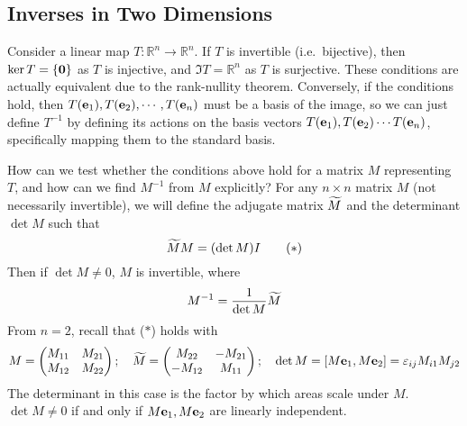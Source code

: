 \subsection{Inverses in Two Dimensions}
Consider a linear map \(T\colon \mathbb R^n \to \mathbb R^n\).
If \(T\) is invertible (i.e.\ bijective), then \(\ker T = \{ \vb 0 \}\) as \(T\) is injective, and \(\Im T = \mathbb R^n\) as \(T\) is surjective.
These conditions are actually equivalent due to the rank-nullity theorem.
Conversely, if the conditions hold, then \(T(\vb e_1), T(\vb e_2), \cdots, T(\vb e_n)\) must be a basis of the image, so we can just define \(T^{-1}\) by defining its actions on the basis vectors \(T(\vb e_1), T(\vb e_2) \cdots T(\vb e_n)\), specifically mapping them to the standard basis.

How can we test whether the conditions above hold for a matrix \(M\) representing \(T\), and how can we find \(M^{-1}\) from \(M\) explicitly? For any \(n \times n\) matrix \(M\) (not necessarily invertible), we will define the adjugate matrix \(\widetilde{M}\) and the determinant \(\det M\) such that
\[
	\widetilde{M} M = (\det M) I \tag{\(\ast\)}
\]
Then if \(\det M \neq 0\), \(M\) is invertible, where
\[
	M^{-1} = \frac{1}{\det M}\widetilde{M}
\]
From \(n=2\), recall that (\(\ast\)) holds with
\[
	M = \begin{pmatrix}
		M_{11} & M_{21} \\
		M_{12} & M_{22}
	\end{pmatrix};\quad \widetilde{M} = \begin{pmatrix}
		M_{22}  & -M_{21} \\
		-M_{12} & M_{11}
	\end{pmatrix};\quad \det M = [M\vb e_1, M\vb e_2] = \varepsilon_{ij}M_{i1}M_{j2}
\]
The determinant in this case is the factor by which areas scale under \(M\).
\(\det M \neq 0\) if and only if \(M\vb e_1, M\vb e_2\) are linearly independent.

